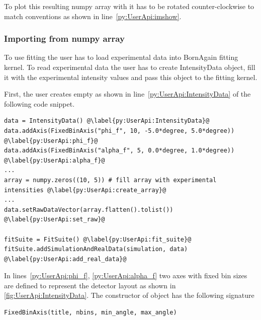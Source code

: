 To plot this resulting numpy array with  it has to be rotated counter-clockwise
to match  conventions as shown in line~\ref{py:UserApi:imshow}.





\subsubsection{Importing from numpy array}

To use fitting the user has to load experimental data into BornAgain fitting kernel.
To read experimental data the user has to create
IntensityData object, fill it with the experimental  intensity values and pass
this object to the fitting kernel.

First, the user creates empty  as shown
in line~\ref{py:UserApi:IntensityData} of the following code snippet.
\begin{lstlisting}
data = IntensityData() @\label{py:UserApi:IntensityData}@
data.addAxis(FixedBinAxis("phi_f", 10, -5.0*degree, 5.0*degree)) @\label{py:UserApi:phi_f}@
data.addAxis(FixedBinAxis("alpha_f", 5, 0.0*degree, 1.0*degree)) @\label{py:UserApi:alpha_f}@
...
array = numpy.zeros((10, 5)) # fill array with experimental intensities @\label{py:UserApi:create_array}@
...
data.setRawDataVector(array.flatten().tolist()) @\label{py:UserApi:set_raw}@

fitSuite = FitSuite() @\label{py:UserApi:fit_suite}@
fitSuite.addSimulationAndRealData(simulation, data) @\label{py:UserApi:add_real_data}@
\end{lstlisting}

In lines~\ref{py:UserApi:phi_f}, \ref{py:UserApi:alpha_f} two axes with fixed bin sizes
are defined to represent the detector layout as shown in \cref{fig:UserApi:IntensityData}.
The constructor of  object has the following signature

\begin{lstlisting}
FixedBinAxis(title, nbins, min_angle, max_angle)
\end{lstlisting}

